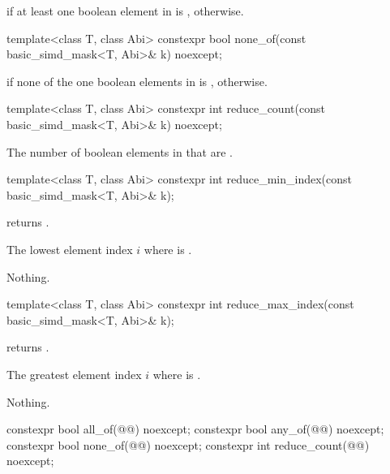 \begin{itemdescr}
  \pnum\returns
   if at least one boolean element in  is ,  otherwise.
\end{itemdescr}

\begin{itemdecl}
template<class T, class Abi> constexpr bool none_of(const basic_simd_mask<T, Abi>& k) noexcept;
\end{itemdecl}

\begin{itemdescr}
  \pnum\returns
   if none of the one boolean elements in  is ,  otherwise.
\end{itemdescr}

\begin{itemdecl}
template<class T, class Abi> constexpr int reduce_count(const basic_simd_mask<T, Abi>& k) noexcept;
\end{itemdecl}

\begin{itemdescr}
  \pnum\returns
  The number of boolean elements in  that are .
\end{itemdescr}

\begin{itemdecl}
template<class T, class Abi> constexpr int reduce_min_index(const basic_simd_mask<T, Abi>& k);
\end{itemdecl}

\begin{itemdescr}
  \pnum\expects
   returns .

  \pnum\returns
  The lowest element index $i$ where  is .

  \pnum\throws Nothing.
\end{itemdescr}

\begin{itemdecl}
template<class T, class Abi> constexpr int reduce_max_index(const basic_simd_mask<T, Abi>& k);
\end{itemdecl}

\begin{itemdescr}
  \pnum\expects
   returns .

  \pnum\returns
  The greatest element index $i$ where  is .

  \pnum\throws Nothing.
\end{itemdescr}

\begin{itemdecl}
constexpr bool all_of(@@) noexcept;
constexpr bool any_of(@@) noexcept;
constexpr bool none_of(@@) noexcept;
constexpr int reduce_count(@@) noexcept;
\end{itemdecl}

